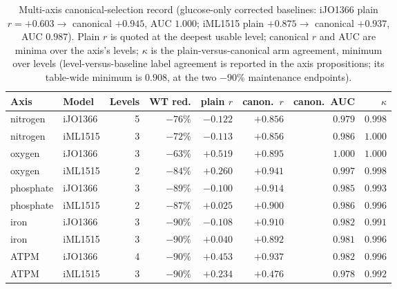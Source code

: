 \begin{table}[t]
\centering
\small
\caption{Multi-axis canonical-selection record (glucose-only
corrected baselines: iJO1366 plain $r=+0.603\to$ canonical
$+0.945$, AUC $1.000$; iML1515 plain $+0.875\to$ canonical
$+0.937$, AUC $0.987$). Plain $r$ is quoted at the deepest usable
level; canonical $r$ and AUC are minima over the axis's levels;
$\kappa$ is the plain-versus-canonical arm agreement, minimum over
levels (level-versus-baseline label agreement is reported in the
axis propositions; its table-wide minimum is $0.908$, at the two
$-90\%$ maintenance endpoints).}
\label{tab:canonical-multiaxis}
\begin{tabular}{llrrrrrr}
\toprule
Axis & Model & Levels & WT red. & plain $r$ & canon.\ $r$ &
canon.\ AUC & $\kappa$ \\
\midrule
nitrogen & iJO1366 & 5 & $-76\%$ & $-0.122$ & $+0.856$ & $0.979$ & $0.998$ \\
nitrogen & iML1515 & 3 & $-72\%$ & $-0.113$ & $+0.856$ & $0.986$ & $1.000$ \\
oxygen & iJO1366 & 3 & $-63\%$ & $+0.519$ & $+0.895$ & $1.000$ & $1.000$ \\
oxygen & iML1515 & 2 & $-84\%$ & $+0.260$ & $+0.941$ & $0.997$ & $0.998$ \\
phosphate & iJO1366 & 3 & $-89\%$ & $-0.100$ & $+0.914$ & $0.985$ & $0.993$ \\
phosphate & iML1515 & 2 & $-87\%$ & $+0.025$ & $+0.900$ & $0.986$ & $0.996$ \\
iron & iJO1366 & 3 & $-90\%$ & $-0.108$ & $+0.910$ & $0.982$ & $0.991$ \\
iron & iML1515 & 3 & $-90\%$ & $+0.040$ & $+0.892$ & $0.981$ & $0.996$ \\
ATPM & iJO1366 & 4 & $-90\%$ & $+0.453$ & $+0.937$ & $0.982$ & $0.996$ \\
ATPM & iML1515 & 3 & $-90\%$ & $+0.234$ & $+0.476$ & $0.978$ & $0.992$ \\
\bottomrule
\end{tabular}
\end{table}

